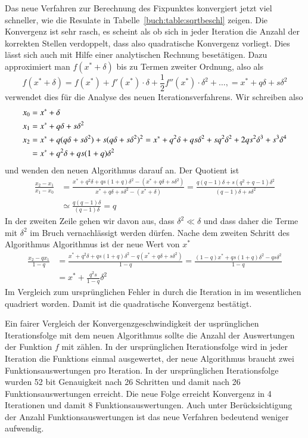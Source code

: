 Das neue Verfahren zur Berechnung des Fixpunktes konvergiert jetzt
viel schneller, wie die Resulate in Tabelle~\ref{buch:table:sqrtbeschl}
zeigen.
Die Konvergenz ist sehr rasch, es scheint als ob sich in jeder
Iteration die Anzahl der korrekten Stellen verdoppelt, dass also
quadratische Konvergenz vorliegt.
Dies lässt sich auch mit Hilfe einer analytischen Rechnung
besetätigen.
Dazu approximiert man $f(x^*+\delta)$ bis zu Termen zweiter Ordnung,
also als
\[
f(x^*+\delta)
=
f(x^*) + f'(x^*)\cdot \delta + \frac12f''(x^*)\cdot \delta^2+ \dots,
=
x^* + q\delta + s\delta^2
\]
verwendet dies für die Analyse des neuen Iterationsverfahrens.
Wir schreiben also
\begin{align}
x_0
&=
x^* + \delta
\label{buch:equation:sqrtbeschllin}
\\
x_1
&=
x^* + q\delta + s\delta^2
\notag
\\
x_2
&=
x^* + q(q\delta+s\delta^2) + s(q\delta+s\delta^2)^2
     = x^* + q^2 \delta + qs\delta^2 + sq^2\delta^2
	+ 2qs^2\delta^3 + s^3\delta^4
\notag
\\
&=
x^* + q^2\delta + qs(1+q)\delta^2
\notag
\end{align}
und wenden den neuen Algorithmus darauf an.
Der Quotient ist
\begin{align*}
\frac{x_2-x_1}{x_1-x_0}
&=
\frac{x^* + q^2\delta + qs(1+q)\delta^2 - 
(x^* + q\delta + s\delta^2)}{
x^* + q\delta + s\delta^2
-
(x^* + \delta)
}
=
\frac{
q(q-1)\delta + s(q^2+q -1) \delta^2
}{
(q-1)\delta + s\delta^2
}
\\
&\simeq
\frac{q(q-1)\delta}{(q-1)\delta}
=
q
\end{align*}
In der zweiten Zeile gehen wir davon aus, dass $\delta^2 \ll \delta$ und
dass daher die Terme mit $\delta^2$ im Bruch vernachlässigt werden dürfen.
Nache dem zweiten Schritt des Algorithmus Algorithmus ist der neue
Wert von $x^*$
\begin{align}
\frac{x_2-qx_1}{1-q}
&=
\frac{
x^* + q^2\delta + qs(1+q)\delta^2
-q(
x^* + q\delta + s\delta^2
)
}{
1-q
}
=
\frac{ (1-q)x^* + qs(1+q)\delta^2 - qs\delta^2 }{1-q}
\label{buch:equation:sqrtnext}
\\
&=
x^* + \frac{q^2s}{1-q}\delta^2
\label{buch:equation:sqrtbeschlquadrat}
\end{align}
Im Vergleich zum ursprünglichen Fehler in 
\label{buch:equation:sqrtbeschllin}
durch die Iteration
in
\label{buch:equation:sqrtbeschlquadrat}
im wesentlichen quadriert worden.
Damit ist die quadratische Konvergenz bestätigt.

Ein fairer Vergleich der Konvergenzgeschwindigkeit der usprünglichen
Iterationsfolge mit dem neuen Algorithmus sollte die Anzahl der
Auswertungen der Funktion $f$ mit zählen. 
In der ursprünglichen Iterationsfolge wird in jeder Iteration die 
Funktions einmal ausgewertet, der neue Algorithmus braucht zwei
Funktionsauswertungen pro Iteration.
In der ursprünglichen Iterationsfolge wurden 52 bit Genauigkeit nach
26 Schritten und damit nach 26 Funktionsauswertungen erreicht.
Die neue Folge erreicht Konvergenz in 4 Iterationen und damit 8
Funktionsauswertungen.
Auch unter Berücksichtigung der Anzahl Funktionsauswertungen ist
das neue Verfahren bedeutend weniger aufwendig.

